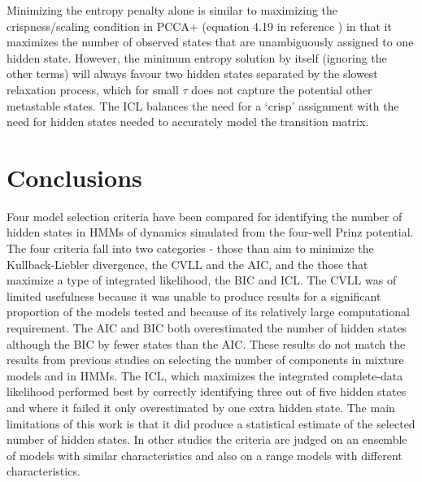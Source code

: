 Minimizing the entropy penalty alone is similar to maximizing the crispness/scaling condition in PCCA+ (equation 4.19 in reference \cite{deuflhardRobustPerronCluster2005b}) in that it maximizes the number of  observed states that are unambiguously assigned to one hidden state. However, the minimum entropy solution by itself (ignoring the other terms) will always favour two hidden states separated by the slowest relaxation process, which for small $\tau$ does not capture the potential other metastable states. The ICL balances the need for a `crisp' assignment with the need for hidden states needed to accurately  model the transition matrix. 

\section{Conclusions}\label{sec:hmm_conclusions}
Four model selection criteria have been compared for identifying the number of hidden states in HMMs of dynamics simulated from the four-well Prinz potential. The four criteria fall into two categories - those than aim to minimize the Kullback-Liebler divergence, the CVLL and the AIC, and the those that maximize a type of integrated likelihood, the BIC and ICL. The CVLL was of limited usefulness because it was unable to produce results for a significant proportion of the models tested and because of its relatively large computational requirement. The AIC and BIC both overestimated the number of hidden states although the BIC by fewer states than the AIC. These results do not match the results from previous studies on selecting the number of components in mixture models and in HMMs. The ICL, which maximizes the integrated complete-data likelihood performed best by correctly identifying three out of five hidden states and where it failed it only overestimated by one extra hidden state. The main limitations of this work is that it did produce a statistical estimate of the selected number of hidden states. In other studies \cite{biernackiAssessingMixtureModel2000a} the criteria are judged on an ensemble of models with similar characteristics and also on a range models with different characteristics.  

